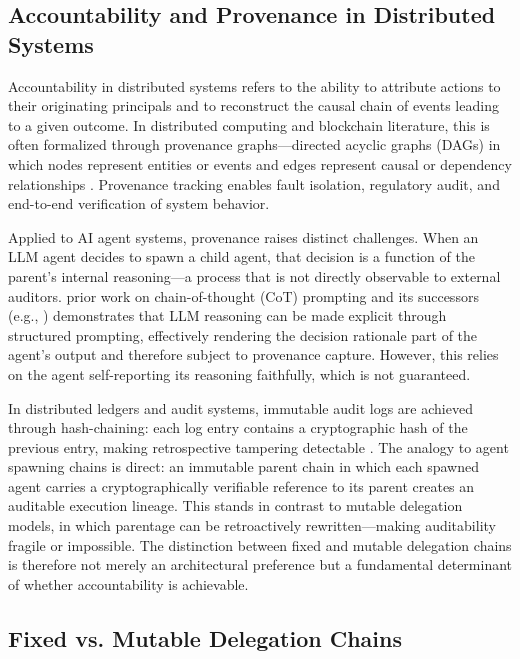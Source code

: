 \subsection{Accountability and Provenance in Distributed Systems}

Accountability in distributed systems refers to the ability to attribute actions to their originating principals and to reconstruct the causal chain of events leading to a given outcome. In distributed computing and blockchain literature, this is often formalized through provenance graphs—directed acyclic graphs (DAGs) in which nodes represent entities or events and edges represent causal or dependency relationships \cite{Cheney2009Provenance}. Provenance tracking enables fault isolation, regulatory audit, and end-to-end verification of system behavior.

Applied to AI agent systems, provenance raises distinct challenges. When an LLM agent decides to spawn a child agent, that decision is a function of the parent's internal reasoning—a process that is not directly observable to external auditors. prior work on chain-of-thought (CoT) prompting \cite{Wei2022ChainOfThought} and its successors (e.g., \cite{Kojima2022Large}) demonstrates that LLM reasoning can be made explicit through structured prompting, effectively rendering the decision rationale part of the agent's output and therefore subject to provenance capture. However, this relies on the agent self-reporting its reasoning faithfully, which is not guaranteed.

In distributed ledgers and audit systems, immutable audit logs are achieved through hash-chaining: each log entry contains a cryptographic hash of the previous entry, making retrospective tampering detectable \cite{Nakamoto2008Bitcoin}. The analogy to agent spawning chains is direct: an immutable parent chain in which each spawned agent carries a cryptographically verifiable reference to its parent creates an auditable execution lineage. This stands in contrast to mutable delegation models, in which parentage can be retroactively rewritten—making auditability fragile or impossible. The distinction between fixed and mutable delegation chains is therefore not merely an architectural preference but a fundamental determinant of whether accountability is achievable.

\subsection{Fixed vs. Mutable Delegation Chains}

